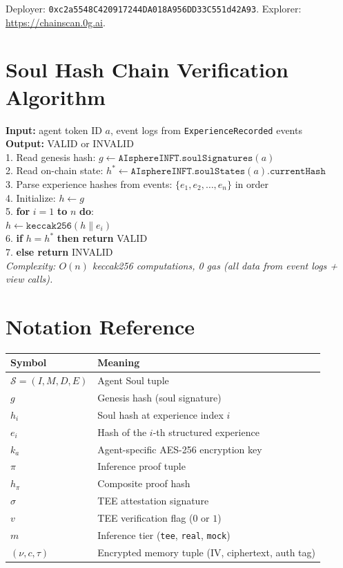\documentclass[10pt,a4paper]{article}
\theoremstyle{definition}
\theoremstyle{plain}
\begin{document}
\noindent Deployer: \texttt{0xc2a5548C420917244DA018A956DD33C551d42A93}. Explorer: \url{https://chainscan.0g.ai}.


\section{Soul Hash Chain Verification Algorithm}
\label{app:verify}

\begin{algbox}
\footnotesize
\textbf{Input:} agent token ID $a$, event logs from \texttt{ExperienceRecorded} events \\
\textbf{Output:} VALID or INVALID \\[4pt]
1. Read genesis hash: $g \gets \texttt{AIsphereINFT.soulSignatures}(a)$ \\
2. Read on-chain state: $h^* \gets \texttt{AIsphereINFT.soulStates}(a).\texttt{currentHash}$ \\
3. Parse experience hashes from events: $\{e_1, e_2, \ldots, e_n\}$ in order \\
4. Initialize: $h \gets g$ \\
5. \textbf{for} $i = 1$ \textbf{to} $n$ \textbf{do}: \\
\quad\quad $h \gets \texttt{keccak256}(h \| e_i)$ \\
6. \textbf{if} $h = h^*$ \textbf{then return} VALID \\
7. \textbf{else return} INVALID \\[4pt]
\textit{Complexity: $O(n)$ keccak256 computations, 0 gas (all data from event logs + view calls).}
\end{algbox}


\section{Notation Reference}
\label{app:notation}

\begin{table}[H]
\centering
\renewcommand{\arraystretch}{1.15}
\footnotesize
\begin{tabularx}{\textwidth}{@{}lX@{}}
\toprule
\textbf{Symbol} & \textbf{Meaning} \\
\midrule
$\mathcal{S} = (I, M, D, E)$ & Agent Soul tuple \\
$g$ & Genesis hash (soul signature) \\
$h_i$ & Soul hash at experience index $i$ \\
$e_i$ & Hash of the $i$-th structured experience \\
$k_a$ & Agent-specific AES-256 encryption key \\
$\pi$ & Inference proof tuple \\
$h_\pi$ & Composite proof hash \\
$\sigma$ & TEE attestation signature \\
$v$ & TEE verification flag ($0$ or $1$) \\
$m$ & Inference tier (\texttt{tee}, \texttt{real}, \texttt{mock}) \\
$(\nu, c, \tau)$ & Encrypted memory tuple (IV, ciphertext, auth tag) \\
\bottomrule
\end{tabularx}
\end{table}
\end{document}
